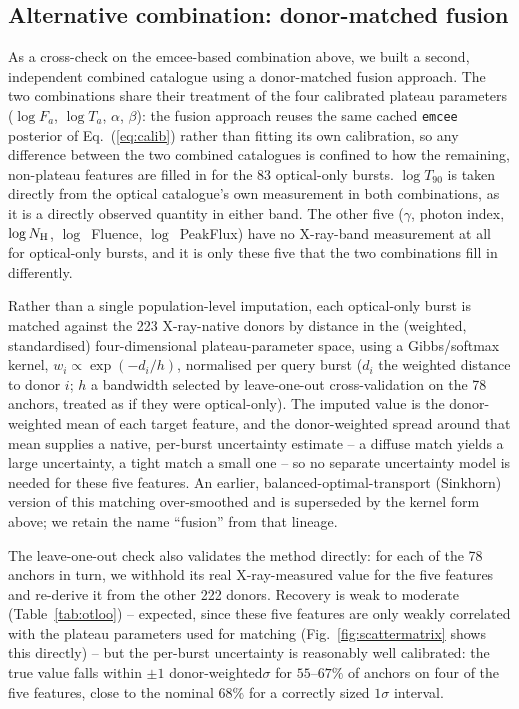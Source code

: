 \documentclass{aa}
\newcommand{\Fa}{F_a}
\newcommand{\Ta}{T_a}
\newcommand{\NH}{N_{\rm H}}
\begin{document}
\subsection{Alternative combination: donor-matched fusion}
\label{sec:ot}

As a cross-check on the emcee-based combination above, we built a second,
independent combined catalogue using a donor-matched fusion approach. The two
combinations share their treatment of the four calibrated plateau parameters
($\log \Fa$, $\log \Ta$, $\alpha$, $\beta$): the fusion approach reuses the same
cached \texttt{emcee} posterior of Eq.~(\ref{eq:calib}) rather than fitting its own
calibration, so any difference between the two combined catalogues is confined to
how the remaining, non-plateau features are filled in for the 83 optical-only
bursts. $\log T_{90}$ is taken directly from the optical catalogue's own
measurement in both combinations, as it is a directly observed quantity in either
band. The other five ($\gamma$, photon index, $\log \NH$, $\log$~Fluence,
$\log$~PeakFlux) have no X-ray-band measurement at all for optical-only bursts, and
it is only these five that the two combinations fill in differently.

Rather than a single population-level imputation, each optical-only burst is
matched against the 223 X-ray-native donors by distance in the (weighted,
standardised) four-dimensional plateau-parameter space, using a Gibbs/softmax
kernel, $w_i \propto \exp(-d_i/h)$, normalised per query burst ($d_i$ the
weighted distance to donor $i$; $h$ a bandwidth selected by leave-one-out
cross-validation on the 78 anchors, treated as if they were optical-only). The
imputed value is the donor-weighted mean of each target feature, and the
donor-weighted spread around that mean supplies a native, per-burst uncertainty
estimate -- a diffuse match yields a large uncertainty, a tight match a small one
-- so no separate uncertainty model is needed for these five features. An earlier,
balanced-optimal-transport (Sinkhorn) version of this matching over-smoothed and
is superseded by the kernel form above; we retain the name ``fusion'' from that
lineage.

The leave-one-out check also validates the method directly: for each of the 78
anchors in turn, we withhold its real X-ray-measured value for the five features
and re-derive it from the other 222 donors. Recovery is weak to moderate
(Table~\ref{tab:otloo}) -- expected, since these five features are only weakly
correlated with the plateau parameters used for matching (Fig.~\ref{fig:scattermatrix}
shows this directly) -- but the per-burst uncertainty is reasonably well calibrated:
the true value falls within $\pm1$ donor-weighted$\sigma$ for $55$--$67\%$ of anchors
on four of the five features, close to the nominal $68\%$ for a correctly sized
$1\sigma$ interval.
\end{document}
